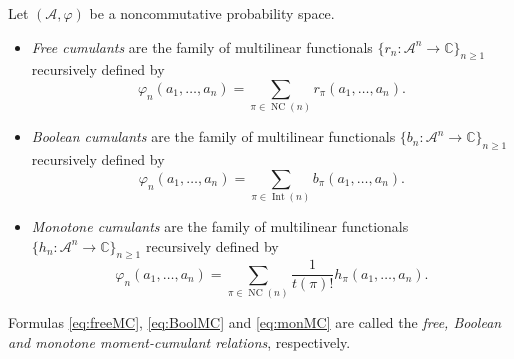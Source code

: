 \documentclass[11pt]{article}
\numberwithin{equation}{section}
\numberwithin{equation}{section}
\newcommand{\A}{\mathcal{A}}
\newcommand{\NC}{\operatorname{NC}}
\newcommand{\Int}{\operatorname{Int}}
\begin{document}
\begin{Definition}
Let $(\A,\varphi)$ be a noncommutative probability space.
\begin{itemize}\itemsep=0pt
\item \textit{Free cumulants} are the family of multilinear functionals $\{r_n\colon \A^n\to\mathbb{C}\}_{n\geq1}$ recursively defined by~\cite{Spe94}
\begin{equation}\label{eq:freeMC}
\varphi_n(a_1,\dots,a_n) = \sum_{\pi\in \NC(n)} r_\pi(a_1,\dots,a_n).
\end{equation}
\item \textit{Boolean cumulants} are the family of multilinear functionals $\{b_n\colon \A^n\to\mathbb{C}\}_{n\geq1}$ recursively defined by~\cite{SW97}
\begin{equation}\label{eq:BoolMC}
\varphi_n(a_1,\dots,a_n) = \sum_{\pi\in \Int(n)} b_\pi(a_1,\dots,a_n).
\end{equation}
\item \textit{Monotone cumulants} are the family of multilinear functionals $\{h_n\colon \A^n\to\mathbb{C}\}_{n\geq1}$ recursively defined by~\cite{HS11b}
\begin{equation}\label{eq:monMC}
\varphi_n(a_1,\dots,a_n) = \sum_{\pi\in \NC(n)} \frac{1}{t(\pi)!} h_\pi(a_1,\dots,a_n).
\end{equation}
\end{itemize}

\end{Definition}
Formulas \eqref{eq:freeMC}, \eqref{eq:BoolMC} and \eqref{eq:monMC} are called the \textit{free, Boolean and monotone moment-cumulant relations}, respectively.

\if

\else
\end{document}
